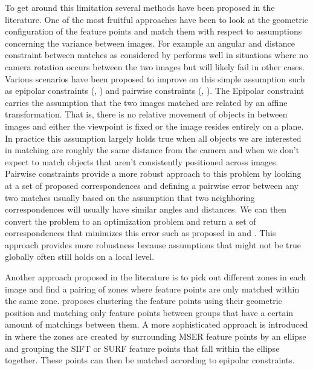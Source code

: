 \documentclass{article}
\begin{document}
To get around this limitation several methods have been proposed in the 
literature. One of the most fruitful approaches have been to look at the 
geometric configuration of the feature points and match them with 
respect to assumptions concerning the variance between images. For 
example an angular and distance constraint between matches as considered 
by \cite{kim2008efficient} performs well in situations where no camera 
rotation occurs between the two images but will likely fail in other 
cases. Various scenarios have been proposed to improve on this simple 
assumption such as epipolar constraints (\cite{torr2000mlesac}, 
\cite{chum2005matching}) and pairwise constraints 
(\cite{choi2009robust}, \cite{leordenanu2005spectral}). The Epipolar 
constraint carries the assumption that the two images matched are 
related by an affine transformation. That is, there is no relative 
movement of objects in between images and either the viewpoint is fixed 
or the image resides entirely on a plane. In practice this assumption 
largely holds true when all objects we are interested in matching are 
roughly the same distance from the camera and when we don't expect to 
match objects that aren't consistently positioned across images.  
Pairwise constraints provide a more robust approach to this problem by 
looking at a set of proposed correspondences and defining a pairwise 
error between any two matches usually based on the assumption that two 
neighboring correspondences will usually have similar angles and 
distances. We can then convert the problem to an optimization problem 
and return a set of correspondences that minimizes this error such as 
proposed in \cite{choi2009robust} and \cite{leordeanu2005spectral}.  
This approach provides more robustness because assumptions that might 
not be true globally often still holds on a local level.

Another approach proposed in the literature is to pick out different 
zones in each image and find a pairing of zones where feature points are 
only matched within the same zone. \cite{das2008event} proposes 
clustering the feature points using their geometric position and 
matching only feature points between groups that have a certain amount 
of matchings between them. A more sophisticated approach is introduced 
in \cite{wu2011robust} where the zones are created by surrounding MSER 
feature points by an ellipse and grouping the SIFT or SURF feature 
points that fall within the ellipse together. These points can then be 
matched according to epipolar constraints.
\end{document}
